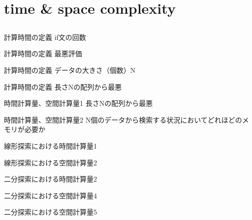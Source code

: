 \documentclass{beamer}
\subtitle{}
\begin{document}
\begin{frame}[fragile]{}
\titlepage
\end{frame}

\section{time \& space complexity}		%
\subsection{}

\begin{frame}[fragile]{計算時間の定義}{}
if文の回数
\end{frame}

\begin{frame}[fragile]{計算時間の定義}{}
最悪評価
\end{frame}

\begin{frame}[fragile]{計算時間の定義}{}
データの大きさ（個数）N
\end{frame}

\begin{frame}[fragile]{計算時間の定義}{}
長さNの配列から最悪
\end{frame}

\begin{frame}[fragile]{時間計算量、空間計算量1}{}
長さNの配列から最悪
\end{frame}

\begin{frame}[fragile]{時間計算量、空間計算量2}{}
N個のデータから検索する状況においてどれほどのメモリが必要か
\end{frame}

\begin{frame}[fragile]{線形探索における時間計算量1}{}
\end{frame}

\begin{frame}[fragile]{線形探索における空間計算量2}{}
\end{frame}


\begin{frame}[fragile]{二分探索における時間計算量2}{}
\end{frame}

\begin{frame}[fragile]{二分探索における空間計算量4}{}
\end{frame}

\begin{frame}[fragile]{二分探索における空間計算量5}{}
\end{frame}
\end{document}
